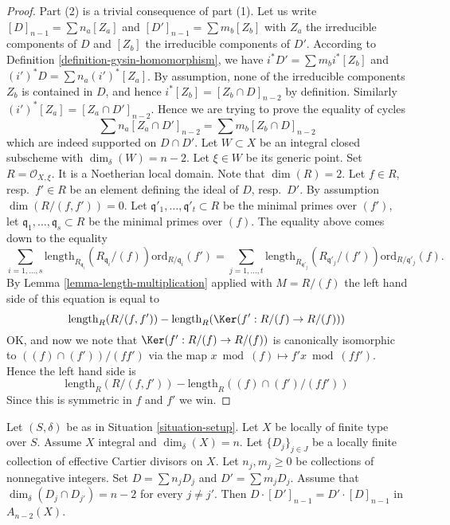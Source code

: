 \begin{proof}
Part (2) is a trivial consequence of part (1).
Let us write $[D]_{n - 1} = \sum n_a[Z_a]$ and
$[D']_{n - 1} = \sum m_b[Z_b]$ with $Z_a$ the irreducible
components of $D$ and $[Z_b]$ the irreducible
components of $D'$.
According to Definition \ref{definition-gysin-homomorphism},
we have $i^*D' = \sum m_b i^*[Z_b]$ and $(i')^*D = \sum n_a(i')^*[Z_a]$.
By assumption, none of the irreducible components $Z_b$
is contained in $D$, and hence $i^*[Z_b] = [Z_b\cap D]_{n - 2}$
by definition. Similarly $(i')^*[Z_a] = [Z_a \cap D']_{n - 2}$.
Hence we are trying to prove the equality of cycles
$$
\sum n_a[Z_a \cap D']_{n - 2} = \sum m_b[Z_b \cap D]_{n - 2}
$$
which are indeed supported on $D \cap D'$.
Let $W \subset X$ be an integral closed subscheme
with $\dim_\delta(W) = n - 2$. Let $\xi \in W$ be its generic point.
Set $R = \mathcal{O}_{X, \xi}$. It is a Noetherian local domain.
Note that $\dim(R) = 2$. Let $f \in R$, resp.\ $f' \in R$
be an element defining the ideal of $D$, resp.\ $D'$.
By assumption $\dim(R/(f, f')) = 0$. Let
$\mathfrak q'_1, \ldots, \mathfrak q'_t \subset R$ be the minimal
primes over $(f')$, let $\mathfrak q_1, \ldots, \mathfrak q_s \subset R$
be the minimal primes over $(f)$.
The equality above comes down to the equality
$$
\sum_{i = 1, \ldots, s}
\text{length}_{R_{\mathfrak q_i}}(R_{\mathfrak q_i}/(f))
\text{ord}_{R/\mathfrak q_i}(f')
=
\sum_{j = 1, \ldots, t}
\text{length}_{R_{\mathfrak q'_j}}(R_{\mathfrak q'_j}/(f'))
\text{ord}_{R/\mathfrak q'_j}(f).
$$
By Lemma \ref{lemma-length-multiplication}
applied with $M = R/(f)$ the left hand side of
this equation is equal to
$$
\text{length}_R(R/(f, f'))
-
\text{length}_R(\Ker(f' : R/(f) \to R/(f)))
$$
OK, and now we note that
$\Ker(f' : R/(f) \to R/(f))$ is canonically isomorphic
to $((f) \cap (f'))/(ff')$ via the map $x \bmod (f) \mapsto
f'x \bmod (ff')$. Hence the left hand side is
$$
\text{length}_R(R/(f, f'))
-
\text{length}_R((f) \cap (f')/(ff'))
$$
Since this is symmetric in $f$ and $f'$ we win.
\end{proof}

\begin{lemma}
\label{lemma-commutativity-effective-Cartier-proper-intersection-infinite}
Let $(S, \delta)$ be as in Situation \ref{situation-setup}.
Let $X$ be locally of finite type over $S$.
Assume $X$ integral and $\dim_\delta(X) = n$.
Let $\{D_j\}_{j \in J}$ be a locally finite collection of
effective Cartier divisors on $X$. Let $n_j, m_j \geq 0$ be
collections of nonnegative integers. Set
$D = \sum n_j D_j$ and $D' = \sum m_j D_j$.
Assume that $\dim_\delta(D_j \cap D_{j'}) = n - 2$ for every
$j \not = j'$. Then $D \cdot [D']_{n - 1} = D' \cdot [D]_{n - 1}$ in
$A_{n - 2}(X)$.
\end{lemma}

